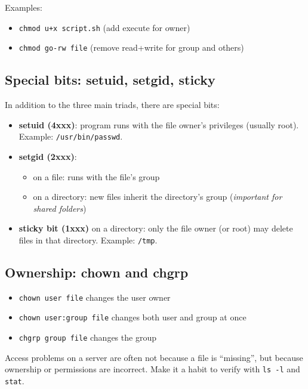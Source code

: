 Examples:
\begin{itemize}
    \item \texttt{chmod u+x script.sh} (add execute for owner)
    \item \texttt{chmod go-rw file} (remove read+write for group and others)
\end{itemize}

\subsection*{Special bits: setuid, setgid, sticky}
In addition to the three main triads, there are special bits:
\begin{itemize}
    \item \textbf{setuid (4xxx)}: program runs with the file owner's privileges (usually root). Example: \texttt{/usr/bin/passwd}.
    \item \textbf{setgid (2xxx)}:
    \begin{itemize}
        \item on a file: runs with the file's group
        \item on a directory: new files inherit the directory's group (\textit{important for shared folders})
    \end{itemize}
    \item \textbf{sticky bit (1xxx)} on a directory: only the file owner (or root) may delete files in that directory.
          Example: \texttt{/tmp}.
\end{itemize}

\subsection*{Ownership: chown and chgrp}
\begin{itemize}
    \item \texttt{chown user file} changes the user owner
    \item \texttt{chown user:group file} changes both user and group at once
    \item \texttt{chgrp group file} changes the group
\end{itemize}

\begin{tipbox}
Access problems on a server are often not because a file is ``missing'', but
because ownership or permissions are incorrect. Make it a habit to verify with
\texttt{ls -l} and \texttt{stat}.
\end{tipbox}

